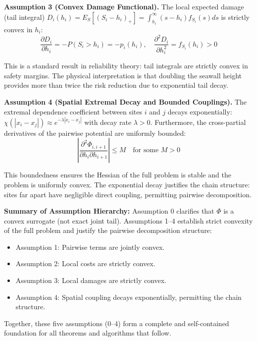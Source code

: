 \documentclass[12pt]{article}
\theoremstyle{definition}
\begin{document}
\begin{boxed}
\textbf{Assumption 3 (Convex Damage Functional).}
The local expected damage (tail integral) $D_i(h_i) = E_S[(S_i - h_i)_+] = \int_{h_i}^\infty (s - h_i) f_{S_i}(s) ds$ is strictly convex in $h_i$:
\[
\frac{\partial D_i}{\partial h_i} = -P(S_i > h_i) = -p_i(h_i), \quad \frac{\partial^2 D_i}{\partial h_i^2} = f_{S_i}(h_i) > 0
\]

This is a standard result in reliability theory: tail integrals are strictly convex in safety margins. The physical interpretation is that doubling the seawall height provides more than twice the risk reduction due to exponential tail decay.
\end{boxed}

\begin{boxed}
\textbf{Assumption 4 (Spatial Extremal Decay and Bounded Couplings).}
The extremal dependence coefficient between sites $i$ and $j$ decays exponentially: $\chi(|x_i - x_j|) \approx e^{-\lambda |x_i - x_j|}$ with decay rate $\lambda > 0$. Furthermore, the cross-partial derivatives of the pairwise potential are uniformly bounded:
\[
\left|\frac{\partial^2 \Phi_{i,i+1}}{\partial h_i \partial h_{i+1}}\right| \leq M \quad \text{for some } M > 0
\]

This boundedness ensures the Hessian of the full problem is stable and the problem is uniformly convex. The exponential decay justifies the chain structure: sites far apart have negligible direct coupling, permitting pairwise decomposition.
\end{boxed}

\noindent\textbf{Summary of Assumption Hierarchy:} Assumption 0 clarifies that $\Phi$ is a convex surrogate (not exact joint tail). Assumptions 1--4 establish strict convexity of the full problem and justify the pairwise decomposition structure:
\begin{itemize}
    \item Assumption 1: Pairwise terms are jointly convex.
    \item Assumption 2: Local costs are strictly convex.
    \item Assumption 3: Local damages are strictly convex.
    \item Assumption 4: Spatial coupling decays exponentially, permitting the chain structure.
\end{itemize}

Together, these five assumptions (0--4) form a complete and self-contained foundation for all theorems and algorithms that follow.
\end{document}
